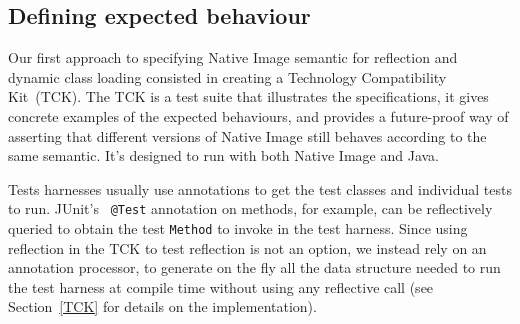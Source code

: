 

\subsection{Defining expected behaviour}
Our first approach to specifying Native Image semantic for reflection and dynamic class loading consisted in creating a Technology Compatibility Kit~(TCK). The TCK is a test suite that illustrates the specifications, it gives concrete examples of the expected behaviours, and provides a future-proof way of asserting that different versions of Native Image still behaves according to the same semantic.
It's designed to run with both Native Image and Java.

Tests harnesses usually use annotations to get the test classes and individual tests to run. JUnit's~\cite{noauthor_junit_nodate} \verb|@Test| annotation on methods, for example, can be reflectively queried to obtain the test \verb|Method| to invoke in the test harness.   
Since using reflection in the TCK to test reflection is not an option, we instead rely on an annotation processor, to generate on the fly all the data structure needed to run the test harness at compile time without using any reflective call (see Section~\ref{TCK} for details on the implementation). 

